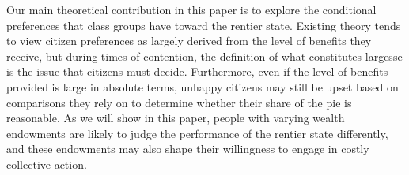 \documentclass[12pt, letterpaper]{article}
\begin{document}


Our main theoretical contribution in this paper is to explore the conditional preferences that class groups have toward the rentier state. Existing theory tends to view citizen preferences as largely derived from the level of benefits they receive, but during times of contention, the definition of what constitutes largesse is the issue that citizens must decide. Furthermore, even if the level of benefits provided is large in absolute terms, unhappy citizens may still be upset based on comparisons they rely on to determine whether their share of the pie is reasonable. As we will show in this paper, people with varying wealth endowments are likely to judge the performance of the rentier state differently, and these endowments may also shape their willingness to engage in costly collective action.

\end{document}

